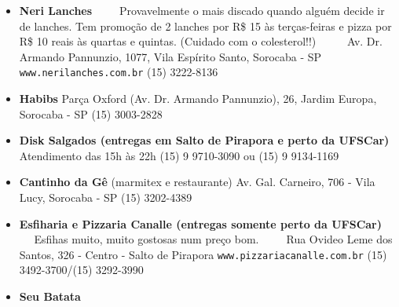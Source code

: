 \begin{multicols}{2}
  \begin{itemize}
    \item \textbf{Neri Lanches}
      \newline Provavelmente o mais discado quando alguém decide ir de lanches. Tem promoção de 2 lanches por R\$ 15 às terças-feiras e pizza por R\$ 10 reais às quartas e quintas. (Cuidado com o colesterol!!)
       \newline Av. Dr. Armando Pannunzio, 1077, Vila Espírito Santo, Sorocaba - SP
      \newline \texttt{www.nerilanches.com.br}
      \newline (15) 3222-8136
  \end{itemize}
  \begin{itemize}
    \item \textbf{Habibs}
      \newline Parça Oxford (Av. Dr. Armando Pannunzio), 26, Jardim Europa, Sorocaba - SP
      \newline (15) 3003-2828
  \end{itemize}
  \begin{itemize}
    \item \textbf{Disk Salgados (entregas em Salto de Pirapora e perto da UFSCar)}
      \newline Atendimento das 15h às 22h
      \newline(15) 9 9710-3090 ou (15) 9 9134-1169
  \end{itemize}
  \begin{itemize}
    \item \textbf{Cantinho da Gê} (marmitex e restaurante)
      \newline Av. Gal. Carneiro, 706 - Vila Lucy, Sorocaba - SP
      \newline (15) 3202-4389
  \end{itemize}
  \begin{itemize}
    \item \textbf{Esfiharia e Pizzaria Canalle (entregas somente perto da UFSCar)}
      \newline Esfihas muito, muito gostosas num preço bom.
      \newline Rua Ovideo Leme dos Santos, 326 - Centro - Salto de Pirapora
      \newline \texttt{www.pizzariacanalle.com.br}
      \newline (15) 3492-3700/(15) 3292-3990
  \end{itemize}
  \begin{itemize}
    \item \textbf{Seu Batata}

\end{itemize}
\end{multicols}
